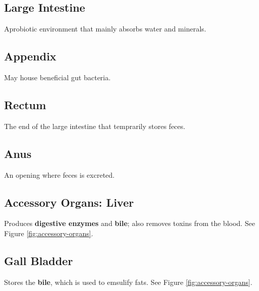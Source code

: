 \documentclass[12pt]{report}
\begin{document}
\subsection{Large Intestine}
\begin{definition}
    Aprobiotic environment that mainly absorbs water and minerals.
\end{definition}

\subsection{Appendix}
\begin{definition}[Appendix]
    May house beneficial gut bacteria.
\end{definition}

\subsection{Rectum}
\begin{definition}[Rectum]
    The end of the large intestine that temprarily stores feces.
\end{definition}

\subsection{Anus}
\begin{definition}[Anus]
    An opening where feces is excreted.
\end{definition}

\divider

\subsection{Accessory Organs: Liver}
\begin{definition}[Liver]
    Produces \textbf{digestive enzymes} and \textbf{bile}; also removes toxins from the blood. See Figure \ref{fig:accessory-organs}.

\end{definition}

\subsection{Gall Bladder}
\begin{definition}
    Stores the \textbf{bile}, which is used to emsulify fats. See Figure \ref{fig:accessory-organs}.
\end{definition}
\end{document}
